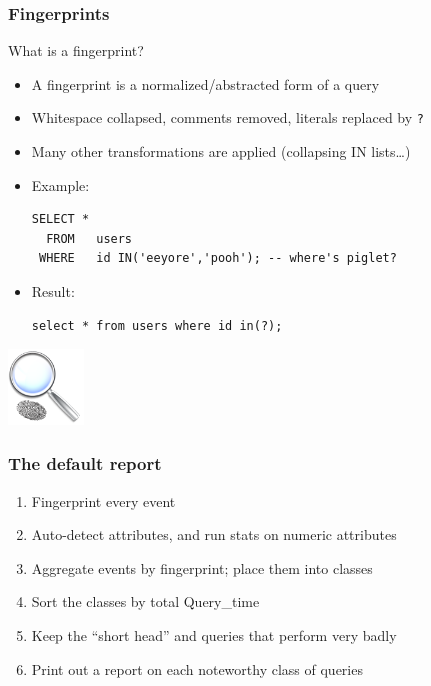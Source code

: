 \begin{frame}[fragile]
   \frametitle{Fingerprints}
   \begin{block}{What is a fingerprint?}
   \begin{itemize}
      \item A fingerprint is a normalized/abstracted form of a query
      \item Whitespace collapsed, comments removed, literals replaced by \texttt{?}
      \item Many other transformations are applied (collapsing IN lists\dots)
      \item Example:
\begin{verbatim}
SELECT *
  FROM   users
 WHERE   id IN('eeyore','pooh'); -- where's piglet?
\end{verbatim}
      \item Result:
\begin{verbatim}
select * from users where id in(?);
\end{verbatim}
   \end{itemize}
   \end{block}
   \includegraphics[width=20mm]{../image/fingerprint}
\end{frame}

\begin{frame}
   \frametitle{The default report}
   \begin{enumerate}
      \item Fingerprint every event
      \item Auto-detect attributes, and run stats on numeric attributes
      \item Aggregate events by fingerprint; place them into classes
      \item Sort the classes by total Query\_time
      \item Keep the ``short head'' and queries that perform very badly
      \item Print out a report on each noteworthy class of queries
   \end{enumerate}
\end{frame}

